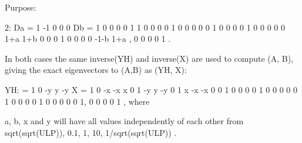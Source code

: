 \begin{DoxyParagraph}{Purpose\+: }
\begin{DoxyVerb}
 2: Da =  1   -1    0    0    0    Db = 1   0   0   0   0
          1    1    0    0    0         0   1   0   0   0
          0    0    1    0    0         0   0   1   0   0
          0    0    0   1+a  1+b        0   0   0   1   0
          0    0    0  -1-b  1+a ,      0   0   0   0   1 .

 In both cases the same inverse(YH) and inverse(X) are used to compute
 (A, B), giving the exact eigenvectors to (A,B) as (YH, X):

 YH:  =  1    0   -y    y   -y    X =  1   0  -x  -x   x
         0    1   -y    y   -y         0   1   x  -x  -x
         0    0    1    0    0         0   0   1   0   0
         0    0    0    1    0         0   0   0   1   0
         0    0    0    0    1,        0   0   0   0   1 , where

 a, b, x and y will have all values independently of each other from
 { sqrt(sqrt(ULP)),  0.1,  1,  10,  1/sqrt(sqrt(ULP)) }.\end{DoxyVerb}
 
\end{DoxyParagraph}

